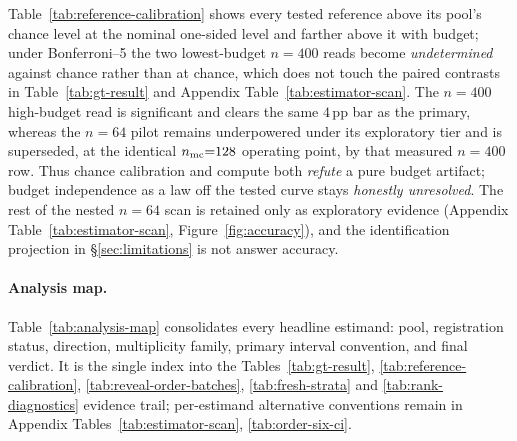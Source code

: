 \documentclass{article}
\newcommand{\pp}{\,\mathrm{pp}}
\begin{document}
Table~\ref{tab:reference-calibration} shows every tested reference above its
pool's chance level at the nominal one-sided level and farther above it with
budget; under Bonferroni--5 the two lowest-budget $n{=}400$ reads become
\emph{undetermined} against chance rather than at chance, which does not touch
the paired contrasts in Table~\ref{tab:gt-result} and Appendix
Table~\ref{tab:estimator-scan}.  The
$n=400$ high-budget read is significant and clears the same $4\pp$ bar as the
primary, whereas the $n=64$ pilot remains underpowered under its exploratory
tier and is superseded, at the identical $n_{\rm mc}{=}128$ operating point, by
that measured $n{=}400$ row.  Thus chance calibration and compute both
\emph{refute} a pure budget artifact; budget independence as a law off the
tested curve stays \emph{honestly unresolved}.  The rest of the nested $n=64$
scan is retained only as exploratory evidence (Appendix
Table~\ref{tab:estimator-scan}, Figure~\ref{fig:accuracy}), and the
identification projection in \S\ref{sec:limitations} is not answer accuracy.

\paragraph{Analysis map.}
Table~\ref{tab:analysis-map} consolidates every headline estimand: pool,
registration status, direction, multiplicity family, primary interval
convention, and final verdict.  It is the single index into the
Tables~\ref{tab:gt-result}, \ref{tab:reference-calibration},
\ref{tab:reveal-order-batches}, \ref{tab:fresh-strata} and
\ref{tab:rank-diagnostics} evidence trail; per-estimand alternative
conventions remain in Appendix
Tables~\ref{tab:estimator-scan}, \ref{tab:order-six-ci}.
\end{document}
